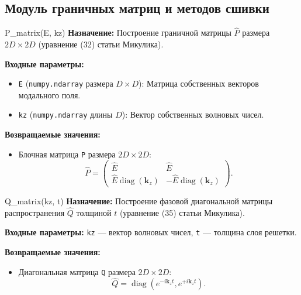 \documentclass[a4paper,11pt]{article}
\begin{document}
\subsection{Модуль граничных матриц и методов сшивки}

\begin{funcbox}{P\_matrix(E, kz)}
\textbf{Назначение:} Построение граничной матрицы $\hat{P}$ размера $2D \times 2D$ (уравнение (32) статьи Микулика).

\textbf{Входные параметры:}
\begin{itemize}
    \item \texttt{E} (\texttt{numpy.ndarray} размера $D \times D$): Матрица собственных векторов модального поля.
    \item \texttt{kz} (\texttt{numpy.ndarray} длины $D$): Вектор собственных волновых чисел.
\end{itemize}

\textbf{Возвращаемые значения:}
\begin{itemize}
    \item Блочная матрица \texttt{P} размера $2D \times 2D$:
    \begin{equation*}
    \hat{P} = \begin{pmatrix} \hat{E} & \hat{E} \\ \hat{E} \operatorname{diag}(\mathbf{k}_z) & -\hat{E} \operatorname{diag}(\mathbf{k}_z) \end{pmatrix}.
    \end{equation*}
\end{itemize}
\end{funcbox}

\begin{funcbox}{Q\_matrix(kz, t)}
\textbf{Назначение:} Построение фазовой диагональной матрицы распространения $\hat{Q}$ толщиной $t$ (уравнение (35) статьи Микулика).

\textbf{Входные параметры:} \texttt{kz} --- вектор волновых чисел, \texttt{t} --- толщина слоя решетки.

\textbf{Возвращаемые значения:}
\begin{itemize}
    \item Диагональная матрица \texttt{Q} размера $2D \times 2D$:
    \begin{equation*}
    \hat{Q} = \operatorname{diag}\left( e^{-i \mathbf{k}_z t}, e^{+i \mathbf{k}_z t} \right).
    \end{equation*}
\end{itemize}
\end{funcbox}
\end{document}
